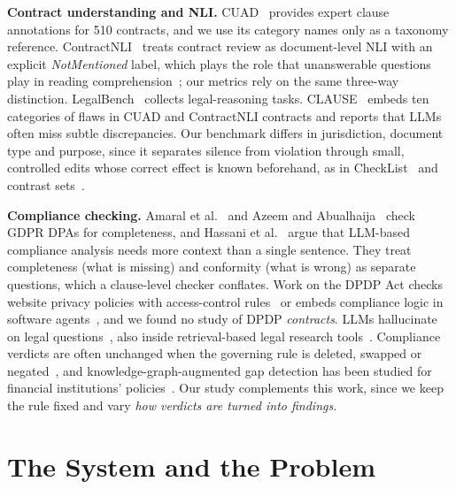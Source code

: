 \documentclass[conference]{IEEEtran}
\begin{document}
\textbf{Contract understanding and NLI.} CUAD~\cite{hendrycks2021cuad} provides expert clause annotations for 510 contracts, and we use its category names only as a taxonomy reference. ContractNLI~\cite{koreeda2021contractnli} treats contract review as document-level NLI with an explicit \emph{NotMentioned} label, which plays the role that unanswerable questions play in reading comprehension~\cite{rajpurkar2018squad2}; our metrics rely on the same three-way distinction. LegalBench~\cite{guha2023legalbench} collects legal-reasoning tasks. CLAUSE~\cite{clause2026} embeds ten categories of flaws in CUAD and ContractNLI contracts and reports that LLMs often miss subtle discrepancies. Our benchmark differs in jurisdiction, document type and purpose, since it separates silence from violation through small, controlled edits whose correct effect is known beforehand, as in CheckList~\cite{ribeiro2020checklist} and contrast sets~\cite{gardner2020contrast}.

\textbf{Compliance checking.} Amaral et al.~\cite{amaral2023dpa} and Azeem and Abualhaija~\cite{azeem2024completeness} check GDPR DPAs for completeness, and Hassani et al.~\cite{hassani2024rethinking} argue that LLM-based compliance analysis needs more context than a single sentence. They treat completeness (what is missing) and conformity (what is wrong) as separate questions, which a clause-level checker conflates. Work on the DPDP Act checks website privacy policies with access-control rules~\cite{dhakar2026apliance} or embeds compliance logic in software agents~\cite{kulkarni2026dpdp}, and we found no study of DPDP \emph{contracts}. LLMs hallucinate on legal questions~\cite{dahl2024fictions}, also inside retrieval-based legal research tools~\cite{magesh2024hallucination}. Compliance verdicts are often unchanged when the governing rule is deleted, swapped or negated~\cite{verdictwithoutrule2026}, and knowledge-graph-augmented gap detection has been studied for financial institutions' policies~\cite{compliancenlp2026}. Our study complements this work, since we keep the rule fixed and vary \emph{how verdicts are turned into findings}.

\section{The System and the Problem}
\end{document}
